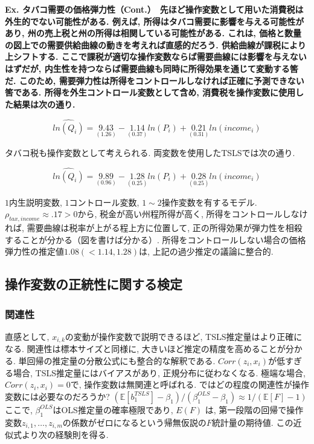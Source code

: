 \documentclass[paper=a4paper,fontsize=10pt]{jlreq}
\begin{document}
\rmfamily\mcfamily\bfseries{Ex. タバコ需要の価格弾力性（Cont.）}\mdseries　先ほど操作変数として用いた消費税は外生的でない可能性がある. 例えば, 所得はタバコ需要に影響を与える可能性があり, 州の売上税と州の所得は相関している可能性がある. これは, 価格と数量の図上での需要供給曲線の動きを考えれば直感的だろう. 供給曲線が課税により上シフトする. ここで課税が適切な操作変数ならば需要曲線には影響を与えないはずだが, 内生性を持つならば需要曲線も同時に所得効果を通じて変動する筈だ. このため, 需要弾力性は所得をコントロールしなければ正確に予測できない筈である. 所得を外生コントロール変数として含め, 消費税を操作変数に使用した結果は次の通り.

\begin{equation*}
  \hat{ln(Q_i)} = \underset{(1.26)}{9.43} - \underset{(0.37)}{1.14}  ln(P_i) + \underset{(0.31)}{0.21}  ln(income_i)
\end{equation*}

タバコ税も操作変数として考えられる. 両変数を使用したTSLSでは次の通り.

\begin{equation*}
  \hat{ln(Q_i)} = \underset{(0.96)}{9.89} - \underset{(0.25)}{1.28}  ln(P_i) + \underset{(0.25)}{0.28}  ln(income_i)
\end{equation*}

$1$内生説明変数, $1$コントロール変数, $1 \sim 2$操作変数を有するモデル. $\rho_{tax, income} \approx .17 > 0$から, 税金が高い州程所得が高く, 所得をコントロールしなければ, 需要曲線は税率が上がる程上方に位置して, 正の所得効果が弾力性を相殺することが分かる（図を書けば分かる）. 所得をコントロールしない場合の価格弾力性の推定値$1.08 (< 1.14, 1.28)$は, 上記の過少推定の議論に整合的.\\

\subsection{操作変数の正統性に関する検定}
\subsubsection{関連性}
直感として, $x_{i,k}$の変動が操作変数で説明できるほど, TSLS推定量はより正確になる. 関連性は標本サイズと同様に, 大きいほど推定の精度を高めることが分かる. 単回帰の推定量の分散公式にも整合的な解釈である. $Corr(z_i , x_i)$が低すぎる場合, TSLS推定量にはバイアスがあり, 正規分布に従わなくなる. 極端な場合, $Corr(z_i , x_i) = 0$で, 操作変数は無関連と呼ばれる. ではどの程度の関連性が操作変数には必要なのだろうか? $(\mathbb{E}[b_1^{TSLS}] - \beta_1)/(\beta_1^{OLS} - \beta_1) \approx 1/(\mathbb{E}[F] - 1)$ ここで, $\beta_1^{OLS}$はOLS推定量の確率極限であり, $E(F)$ は, 第一段階の回帰で操作変数$z_{i,1}, \dots, z_{i,m}$の係数がゼロになるという帰無仮説の$F$統計量の期待値. この近似式より次の経験則を得る.\\
\end{document}
